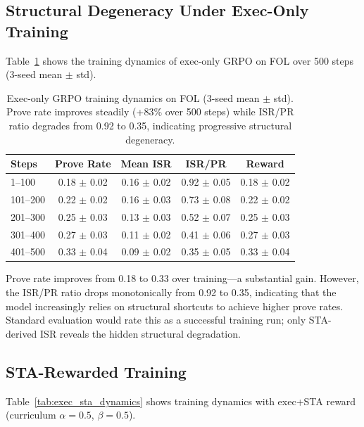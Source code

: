 \documentclass[11pt,a4paper]{article}
\begin{document}
\subsection{Structural Degeneracy Under Exec-Only Training}
\label{sec:exec_only}

Table~\ref{tab:exec_only_dynamics} shows the training dynamics of exec-only GRPO on FOL over 500 steps (3-seed mean $\pm$ std).

\begin{table}[t]
\centering
\small
\begin{tabular}{lcccc}
\toprule
\textbf{Steps} & \textbf{Prove Rate} & \textbf{Mean ISR} & \textbf{ISR/PR} & \textbf{Reward} \\
\midrule
1--100 & 0.18 $\pm$ 0.02 & 0.16 $\pm$ 0.02 & 0.92 $\pm$ 0.05 & 0.18 $\pm$ 0.02 \\
101--200 & 0.22 $\pm$ 0.02 & 0.16 $\pm$ 0.03 & 0.73 $\pm$ 0.08 & 0.22 $\pm$ 0.02 \\
201--300 & 0.25 $\pm$ 0.03 & 0.13 $\pm$ 0.03 & 0.52 $\pm$ 0.07 & 0.25 $\pm$ 0.03 \\
301--400 & 0.27 $\pm$ 0.03 & 0.11 $\pm$ 0.02 & 0.41 $\pm$ 0.06 & 0.27 $\pm$ 0.03 \\
401--500 & 0.33 $\pm$ 0.04 & 0.09 $\pm$ 0.02 & 0.35 $\pm$ 0.05 & 0.33 $\pm$ 0.04 \\
\bottomrule
\end{tabular}
\caption{Exec-only GRPO training dynamics on FOL (3-seed mean $\pm$ std). Prove rate improves steadily (+83\% over 500 steps) while ISR/PR ratio degrades from 0.92 to 0.35, indicating progressive structural degeneracy.}
\label{tab:exec_only_dynamics}
\end{table}

Prove rate improves from 0.18 to 0.33 over training---a substantial gain. However, the ISR/PR ratio drops monotonically from 0.92 to 0.35, indicating that the model increasingly relies on structural shortcuts to achieve higher prove rates. Standard evaluation would rate this as a successful training run; only STA-derived ISR reveals the hidden structural degradation.

\subsection{STA-Rewarded Training}
\label{sec:exec_sta}

Table~\ref{tab:exec_sta_dynamics} shows training dynamics with exec+STA reward (curriculum $\alpha=0.5$, $\beta=0.5$).
\end{document}
